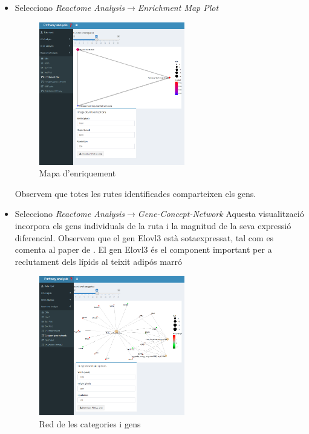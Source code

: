 \begin{enumerate}
\begin{itemize}
\item Selecciono \textit{Reactome Analysis}$\rightarrow$\textit{\gls{Enrichment Map} Plot}

\begin{figure}[H]
\centering
\includegraphics[width=0.6\textwidth]{figures/Estudi1_Fig6_ORA_EP_RA.png} 
\caption{Mapa d'enriquement}
\end{figure}

Observem que totes les rutes identificades comparteixen els gens.

\item Selecciono \textit{Reactome Analysis}$\rightarrow$\textit{\gls{Gene-Concept-Network}}
Aquesta visualització incorpora els gens individuals de la ruta i la magnitud de la seva expressió diferencial. Observem que el gen Elovl3 està sotaexpressat, tal com es comenta al paper de \cite{li2017zbtb7b}. El gen Elovl3 és el component important per a reclutament dels lípids al teixit adipós marró \cite{westerberg2006elovl3}

\begin{figure}[H]
\centering
\includegraphics[width=0.6\textwidth]{figures/Estudi1_Fig7_ORA_CP_RA.png} 
\caption{Red de les categories i gens}
\end{figure}


\end{itemize}
\end{enumerate}
